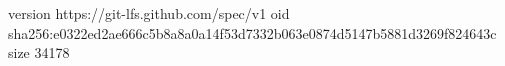 version https://git-lfs.github.com/spec/v1
oid sha256:e0322ed2ae666c5b8a8a0a14f53d7332b063e0874d5147b5881d3269f824643c
size 34178
